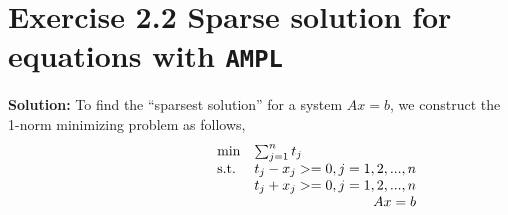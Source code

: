 \section{Exercise 2.2 Sparse solution for equations with {\tt AMPL}}
\textbf{Solution:}
To find the ``sparsest solution'' for a system $Ax=b$, we construct the 1-norm minimizing problem as follows,
\begin{equation}
\label{eq: sparse}
  \begin{array}{lrcll}
    \min
    & \multicolumn{4}{l}{\sum_{j=1}^{n} t_j} \\
    \text{s.t.}
    & t_j-x_j >=0, j=1,2,...,n\\
    & t_j+x_j >=0, j=1,2,...,n\\
    & Ax=b 
  \end{array}
\end{equation}